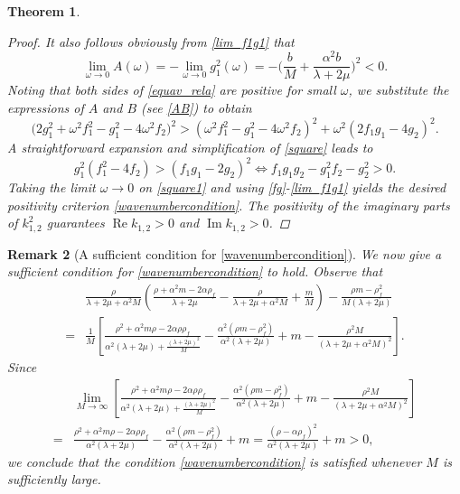 \documentclass[11pt]{article}
\newcommand{\ds}{\displaystyle}
\newcommand{\om}{\omega}
\newcommand{\la}{\lambda}
\newtheorem{theorem}{Theorem}[section]
\newtheorem{remark}[theorem]{Remark}
\begin{document}
\begin{theorem}
\begin{proof}
It also follows obviously from \eqref{lim_f1g1} that
\begin{equation*}
\ds\lim_{\omega \to 0}A(\omega)=-\lim_{\omega \to 0}g_1^2(\om)=-\Big(\frac{ b}{M}
+\frac{\alpha^2 b}{\la+2\mu}\Big) ^2 < 0.
\end{equation*}
Noting that both sides of \eqref{equav_rela} are positive for small $\omega$, we substitute 
the expressions of $A$ and $B$ (see \eqref{AB}) to obtain
\begin{equation}\label{square}
\bigl(2g_1^2 + \omega^2 f_1^2 - g_1^2 - 4\omega^2 f_2\bigr)^2
> (\omega^2 f_1^2 - g_1^2 - 4\omega^2 f_2)^2 + \omega^2 (2f_1 g_1 - 4g_2)^2.
\end{equation}
A straightforward expansion and simplification of \eqref{square} leads to
\begin{equation}\label{square1}
g_1^2(f_1^2 - 4f_2) > (f_1 g_1 - 2g_2)^2 \Longleftrightarrow f_1 g_1 g_2 - g_1^2 f_2 - g_2^2 > 0.
\end{equation}
Taking the limit $\omega \to 0$ on \eqref{square1} and using \eqref{fg}-\eqref{lim_f1g1} yields 
the desired positivity criterion \eqref{wavenumbercondition}.  The positivity of the imaginary 
parts of $k_{1,2}^2$ guarantees  $\operatorname{Re} k_{1,2} > 0$ and $\operatorname{Im} k_{1,2} > 0$.
\end{proof}

\end{theorem}
\begin{remark}[A sufficient condition for \eqref{wavenumbercondition}]
{\rm We now give a sufficient condition for \eqref{wavenumbercondition} to hold. Observe that
\begin{equation}
\begin{aligned}
&\frac{\rho}{\la+2\mu+\alpha^2M}\left(\frac{\rho+\alpha^2m-2\alpha \rho_f}{\la+2\mu}-\frac{\rho}
{\la+2\mu+\alpha^2M}+\frac{m}{M}\right)-\frac{\rho m-\rho_f^2}{M(\la+2\mu)}\\ 
=&\frac{1}{M}\left[\frac{\rho^2+\alpha^2m\rho-2\alpha\rho \rho_f}{\alpha^2(\la+2\mu)
+\ds\frac{(\la+2\mu)^2}{M}}-\frac{\alpha^2(\rho m-\rho_f^2)}{\alpha^2(\la+2\mu)}+m
-\frac{\rho^2M}{(\la+2\mu+\alpha^2M)^2}\right].
\end{aligned}
\end{equation}
Since
\begin{equation*}
\begin{aligned}
& \ds\lim_{M\to \infty}\left[\frac{\rho^2+\alpha^2m\rho-2\alpha\rho \rho_f}{\alpha^2(\la+2\mu)
+\ds\frac{(\la+2\mu)^2}{M}}-\frac{\alpha^2(\rho m-\rho_f^2)}{\alpha^2(\la+2\mu)}+m-\frac{\rho^2M}
{(\la+2\mu+\alpha^2M)^2}\right]\\
=&\frac{\rho^2+\alpha^2m\rho-2\alpha\rho \rho_f}{\alpha^2(\la+2\mu)}-\frac{\alpha^2(\rho m-\rho_f^2)}
{\alpha^2(\la+2\mu)}+m=\frac{(\rho-\alpha\rho_f)^2}{\alpha^2(\la+2\mu)}+m>0,
\end{aligned}
\end{equation*}
we conclude that the condition \eqref{wavenumbercondition} is satisfied whenever $M$ is sufficiently large.}
\end{remark}
\end{document}
